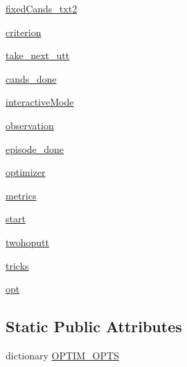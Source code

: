 \begin{DoxyCompactItemize}
\item 
\hyperlink{classprojects_1_1personachat_1_1kvmemnn_1_1kvmemnn_1_1KvmemnnAgent_a1f97013332930c41aa8839be4fc78b40}{fixed\+Cands\+\_\+txt2}
\item 
\hyperlink{classprojects_1_1personachat_1_1kvmemnn_1_1kvmemnn_1_1KvmemnnAgent_a8a124eccb81be3ce6c44ccb3974acc68}{criterion}
\item 
\hyperlink{classprojects_1_1personachat_1_1kvmemnn_1_1kvmemnn_1_1KvmemnnAgent_a197c4ee11a4536d738a632f46847cc89}{take\+\_\+next\+\_\+utt}
\item 
\hyperlink{classprojects_1_1personachat_1_1kvmemnn_1_1kvmemnn_1_1KvmemnnAgent_a4e00699d90d4efcc4c7565877a3d2adc}{cands\+\_\+done}
\item 
\hyperlink{classprojects_1_1personachat_1_1kvmemnn_1_1kvmemnn_1_1KvmemnnAgent_aad3af91663688393121d6475cadec9cc}{interactive\+Mode}
\item 
\hyperlink{classprojects_1_1personachat_1_1kvmemnn_1_1kvmemnn_1_1KvmemnnAgent_afd7921cc7a7e9aa7a8d3a454cf6d6176}{observation}
\item 
\hyperlink{classprojects_1_1personachat_1_1kvmemnn_1_1kvmemnn_1_1KvmemnnAgent_a6026c6d8fc17ff4dd51536087fce18b5}{episode\+\_\+done}
\item 
\hyperlink{classprojects_1_1personachat_1_1kvmemnn_1_1kvmemnn_1_1KvmemnnAgent_ae9a0118914d6d1c9be4ecc428934b537}{optimizer}
\item 
\hyperlink{classprojects_1_1personachat_1_1kvmemnn_1_1kvmemnn_1_1KvmemnnAgent_aca0257f35b72dc504f9edc52a7de433e}{metrics}
\item 
\hyperlink{classprojects_1_1personachat_1_1kvmemnn_1_1kvmemnn_1_1KvmemnnAgent_a18725fe3d8fafd7f7bb77375d9746243}{start}
\item 
\hyperlink{classprojects_1_1personachat_1_1kvmemnn_1_1kvmemnn_1_1KvmemnnAgent_abfdc212a6bfaa2af3eafcff11734d05c}{twohoputt}
\item 
\hyperlink{classprojects_1_1personachat_1_1kvmemnn_1_1kvmemnn_1_1KvmemnnAgent_a17cc75d3ddbb3859ad5bee04542acd53}{tricks}
\item 
\hyperlink{classprojects_1_1personachat_1_1kvmemnn_1_1kvmemnn_1_1KvmemnnAgent_a4e25d0aaf32c5bcc9429c6825ba214c4}{opt}
\end{DoxyCompactItemize}
\subsection*{Static Public Attributes}
\begin{DoxyCompactItemize}
\item 
dictionary \hyperlink{classprojects_1_1personachat_1_1kvmemnn_1_1kvmemnn_1_1KvmemnnAgent_a7908bfbdf08882c8967ea465a7a5f1a7}{O\+P\+T\+I\+M\+\_\+\+O\+P\+TS}
\end{DoxyCompactItemize}


